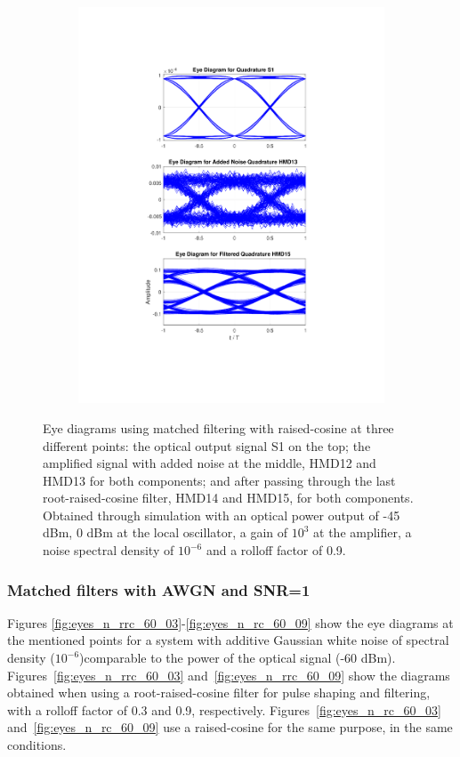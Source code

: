 \begin{figure}[H]
\begin{subfigure}{.45\textwidth}
		\includegraphics[clip, trim=5cm 4cm 5cm 4cm, width=\textwidth]{./sdf/m_qam_system/figures/eyes/q_n_p_45_09_rc.pdf}
	\end{subfigure}
	
	\caption{Eye diagrams using matched filtering with raised-cosine at three different points: the optical output signal S1 on the top; the amplified signal with added noise at the middle, HMD12 and HMD13 for both components; and after passing through the last root-raised-cosine filter, HMD14 and HMD15, for both components. Obtained through simulation with an optical power output of -45 dBm, 0 dBm at the local oscillator, a gain of $10^3$ at the amplifier, a noise spectral density of $10^{-6}$ and a rolloff factor of 0.9.\label{fig:eyes_n_rc_45_09}}
	
\end{figure}

\subsubsection*{Matched filters with AWGN and SNR=1}
Figures \ref{fig:eyes_n_rrc_60_03}-\ref{fig:eyes_n_rc_60_09} show the eye diagrams at the mentioned points for a system with additive Gaussian white noise of spectral density ($10^{-6}$)comparable to the power of the optical signal (-60 dBm). Figures~\ref{fig:eyes_n_rrc_60_03} and~\ref{fig:eyes_n_rrc_60_09} show the diagrams obtained when using a root-raised-cosine filter for pulse shaping and filtering, with a rolloff factor of 0.3 and 0.9, respectively. Figures~\ref{fig:eyes_n_rc_60_03} and~\ref{fig:eyes_n_rc_60_09} use a raised-cosine for the same purpose, in the same conditions.


